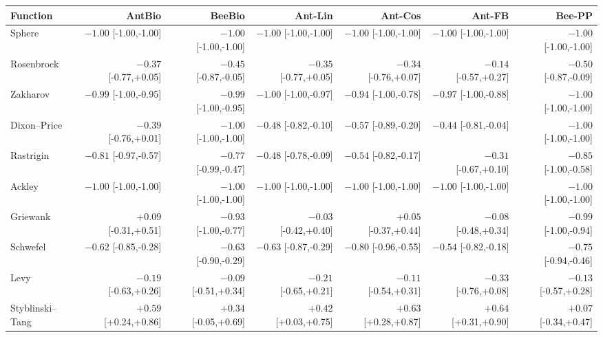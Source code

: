 \begin{tabular}{lrrrrrr}
\toprule
Function & AntBio & BeeBio & Ant-Lin & Ant-Cos & Ant-FB & Bee-PP \\
\midrule
Sphere & $-1.00$ {\tiny[-1.00,-1.00]} & $-1.00$ {\tiny[-1.00,-1.00]} & $-1.00$ {\tiny[-1.00,-1.00]} & $-1.00$ {\tiny[-1.00,-1.00]} & $-1.00$ {\tiny[-1.00,-1.00]} & $-1.00$ {\tiny[-1.00,-1.00]} \\
Rosenbrock & $-0.37$ {\tiny[-0.77,+0.05]} & $-0.45$ {\tiny[-0.87,-0.05]} & $-0.35$ {\tiny[-0.77,+0.05]} & $-0.34$ {\tiny[-0.76,+0.07]} & $-0.14$ {\tiny[-0.57,+0.27]} & $-0.50$ {\tiny[-0.87,-0.09]} \\
Zakharov & $-0.99$ {\tiny[-1.00,-0.95]} & $-0.99$ {\tiny[-1.00,-0.95]} & $-1.00$ {\tiny[-1.00,-0.97]} & $-0.94$ {\tiny[-1.00,-0.78]} & $-0.97$ {\tiny[-1.00,-0.88]} & $-1.00$ {\tiny[-1.00,-1.00]} \\
Dixon--Price & $-0.39$ {\tiny[-0.76,+0.01]} & $-1.00$ {\tiny[-1.00,-1.00]} & $-0.48$ {\tiny[-0.82,-0.10]} & $-0.57$ {\tiny[-0.89,-0.20]} & $-0.44$ {\tiny[-0.81,-0.04]} & $-1.00$ {\tiny[-1.00,-1.00]} \\
Rastrigin & $-0.81$ {\tiny[-0.97,-0.57]} & $-0.77$ {\tiny[-0.99,-0.47]} & $-0.48$ {\tiny[-0.78,-0.09]} & $-0.54$ {\tiny[-0.82,-0.17]} & $-0.31$ {\tiny[-0.67,+0.10]} & $-0.85$ {\tiny[-1.00,-0.58]} \\
Ackley & $-1.00$ {\tiny[-1.00,-1.00]} & $-1.00$ {\tiny[-1.00,-1.00]} & $-1.00$ {\tiny[-1.00,-1.00]} & $-1.00$ {\tiny[-1.00,-1.00]} & $-1.00$ {\tiny[-1.00,-1.00]} & $-1.00$ {\tiny[-1.00,-1.00]} \\
Griewank & $+0.09$ {\tiny[-0.31,+0.51]} & $-0.93$ {\tiny[-1.00,-0.77]} & $-0.03$ {\tiny[-0.42,+0.40]} & $+0.05$ {\tiny[-0.37,+0.44]} & $-0.08$ {\tiny[-0.48,+0.34]} & $-0.99$ {\tiny[-1.00,-0.94]} \\
Schwefel & $-0.62$ {\tiny[-0.85,-0.28]} & $-0.63$ {\tiny[-0.90,-0.29]} & $-0.63$ {\tiny[-0.87,-0.29]} & $-0.80$ {\tiny[-0.96,-0.55]} & $-0.54$ {\tiny[-0.82,-0.18]} & $-0.75$ {\tiny[-0.94,-0.46]} \\
Levy & $-0.19$ {\tiny[-0.63,+0.26]} & $-0.09$ {\tiny[-0.51,+0.34]} & $-0.21$ {\tiny[-0.65,+0.21]} & $-0.11$ {\tiny[-0.54,+0.31]} & $-0.33$ {\tiny[-0.76,+0.08]} & $-0.13$ {\tiny[-0.57,+0.28]} \\
Styblinski--Tang & $+0.59$ {\tiny[+0.24,+0.86]} & $+0.34$ {\tiny[-0.05,+0.69]} & $+0.42$ {\tiny[+0.03,+0.75]} & $+0.63$ {\tiny[+0.28,+0.87]} & $+0.64$ {\tiny[+0.31,+0.90]} & $+0.07$ {\tiny[-0.34,+0.47]} \\
\bottomrule
\end{tabular}
